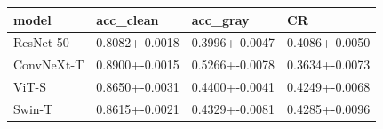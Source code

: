 \begin{tabular}{llll}
\toprule
model & acc_clean & acc_gray & CR \\
\midrule
ResNet-50 & 0.8082+-0.0018 & 0.3996+-0.0047 & 0.4086+-0.0050 \\
ConvNeXt-T & 0.8900+-0.0015 & 0.5266+-0.0078 & 0.3634+-0.0073 \\
ViT-S & 0.8650+-0.0031 & 0.4400+-0.0041 & 0.4249+-0.0068 \\
Swin-T & 0.8615+-0.0021 & 0.4329+-0.0081 & 0.4285+-0.0096 \\
\bottomrule
\end{tabular}
